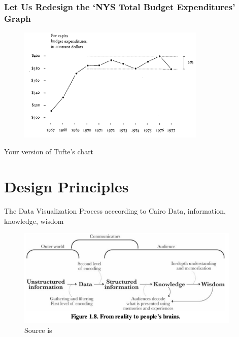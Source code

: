 \documentclass[notes, aspectratio=1610]{beamer}
\begin{document}
\begin{frame}
	\frametitle{Let Us Redesign the `NYS Total Budget Expenditures' Graph}
	\begin{figure}
		\begin{small}
			\begin{center}
				\includegraphics[width=0.8\textwidth]{
					images/redo_nys_budget.png
					}
			\end{center}
		\end{small}
	\end{figure}
\end{frame}

\begin{frame}{}
	\LARGE \centering Your version of Tufte's chart 
\end{frame}

\section{Design Principles}

\begin{frame}{The Data Visualization Process acccording to Cairo}
	{Data, information, knowledge, wisdom}{}
	\begin{figure}
		\includegraphics[width=0.95\textwidth]{images/cairo_model.png}
		\caption*{Source is \cite[][page 29]{cairo2012}}
	\end{figure}
\end{frame}
\end{document}
